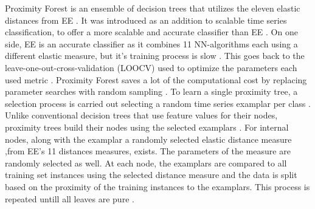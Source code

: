 Proximity Forest is an ensemble of decision trees that utilizes the eleven elastic distances from EE \cite{fawaz2020inceptiontime,fawaz2019deep}.
It was introduced as an addition to scalable time series classification, to offer a more scalable and accurate classifier than EE \cite{tan2020fastee}.
On one side, EE is an accurate classifier as it combines 11 NN-algorithms each using a different elastic measure, but it's training process is slow \cite{lines2015time,bagnall2017great}.
This goes back to the leave-one-out-cross-validation (LOOCV) used to optimize the parameters each used metric \cite{shifaz2020ts}.
Proximity Forest saves a lot of the computational cost by replacing parameter searches with random sampling \cite{fawaz2020inceptiontime,fawaz2019deepreview}.\newline
To learn a single proximity tree, a selection process is carried out selecting a random time series examplar per class \cite{lucas2019proximity}.
Unlike conventional decision trees that use feature values for their nodes, proximity trees build their nodes using the selected examplars \cite{lucas2019proximity}.
For internal nodes, along with the examplar a randomly selected elastic distance measure ,from EE's 11 distances measures, exists. The parameters of the measure are randomly selected as well.
At each node, the examplars are compared to all training set instances using the selected distance measure and the data is split based on the proximity
of the training instances to the examplars. This process is repeated untill all leaves are pure \cite{lucas2019proximity}.
